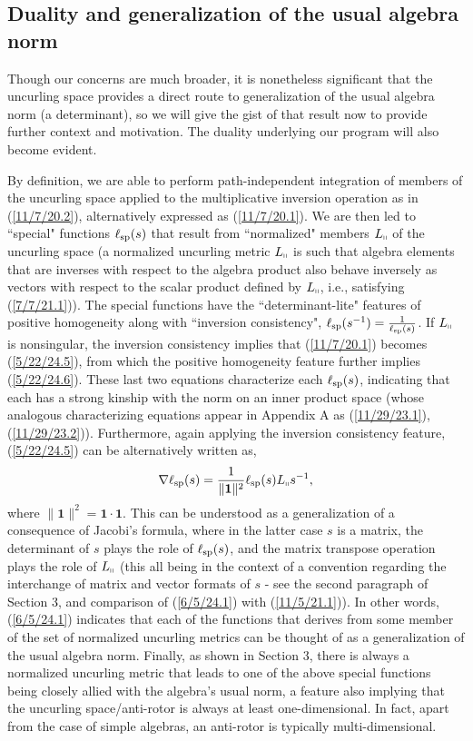\documentclass{amsart}
\numberwithin{equation}{section}
\theoremstyle{definition}
\numberwithin{theorem}{section}
\begin{document}
 
  \subsection{Duality and generalization of the usual algebra norm}
    Though our concerns are much broader, it is nonetheless significant that the uncurling space provides a direct route to generalization of the usual algebra norm (a determinant), so we will give the gist of that result now to provide further context and motivation.  The duality underlying our program will also become evident.
 
 By definition, we are able to perform path-independent integration of members of the uncurling space applied to the multiplicative inversion operation as in (\ref{11/7/20.2}), alternatively expressed as (\ref{11/7/20.1}).  
We are then led to ``special" functions $\ell_{\rm sp}(s)$ that result from ``normalized" members $L_{\shortparallel}$ of the uncurling space (a normalized uncurling metric $L_{\shortparallel}$ is such that algebra elements that are inverses with respect to the algebra product also behave inversely as vectors with respect to the scalar product defined by $L_{\shortparallel}$, i.e., satisfying (\ref{7/7/21.1})).  The special functions have the \mbox{``determinant-lite"} features of positive homogeneity along with ``inversion consistency", $\ell_{\rm sp}(s^{-1}) = \frac{1}{\ell_{\rm sp}(s)}$.  If $L_{\shortparallel}$ is nonsingular, the inversion consistency implies that (\ref{11/7/20.1}) becomes (\ref{5/22/24.5}), from which the positive homogeneity feature further implies (\ref{5/22/24.6}).  These last two equations characterize each $\ell_{\rm sp}(s)$, indicating that each has a strong kinship with the norm on an inner product space (whose analogous characterizing equations appear in Appendix A as (\ref{11/29/23.1}),  (\ref{11/29/23.2})). Furthermore, again applying the inversion consistency feature, (\ref{5/22/24.5}) can be alternatively written as,  \begin{equation}\label{6/5/24.1} \nabla\ell_{\rm sp}(s) = \frac{1}{\|\mathbf{1}\|^2}\ell_{\rm sp}(s) L_{\shortparallel}s^{-1},\end{equation} where $\|\mathbf{1}\|^2 = \mathbf{1}\cdot \mathbf{1}$. This can be understood as a generalization of a consequence of Jacobi's formula, where in the latter case $s$ is a matrix, the determinant of $s$ plays the role of $\ell_{\rm sp}(s)$, and the matrix transpose operation plays the role of $L_{\shortparallel}$ (this all being in the context of a convention regarding the interchange of matrix and vector formats of $s$  -  see the second paragraph of Section 3, and comparison of (\ref{6/5/24.1}) with (\ref{11/5/21.1})).  In other words, (\ref{6/5/24.1}) indicates that each of the functions that derives from some member of the set of normalized uncurling metrics can be thought of as a generalization of the usual algebra norm.  Finally, as shown in Section 3, there is always a normalized uncurling metric that leads to one of the above special functions being closely allied with the algebra's usual norm, a feature also implying that the uncurling space/anti-rotor is always at least one-dimensional.  In fact, apart from the case of simple algebras, an anti-rotor is typically multi-dimensional.  
\end{document}
